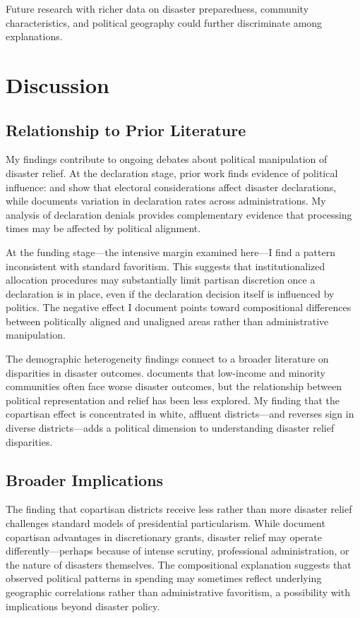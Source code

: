 \documentclass[12pt,letterpaper,oneside]{book}
\begin{document}
Future research with richer data on disaster preparedness, community characteristics, and political geography could further discriminate among explanations.

\section{Discussion}

\subsection{Relationship to Prior Literature}

My findings contribute to ongoing debates about political manipulation of disaster relief. At the declaration stage, prior work finds evidence of political influence: \cite{reeves2011political} and \cite{gasper2011make} show that electoral considerations affect disaster declarations, while \cite{sylves2008presidential} documents variation in declaration rates across administrations. My analysis of declaration denials provides complementary evidence that processing times may be affected by political alignment.

At the funding stage---the intensive margin examined here---I find a pattern inconsistent with standard favoritism. This suggests that institutionalized allocation procedures may substantially limit partisan discretion once a declaration is in place, even if the declaration decision itself is influenced by politics. The negative effect I document points toward compositional differences between politically aligned and unaligned areas rather than administrative manipulation.

The demographic heterogeneity findings connect to a broader literature on disparities in disaster outcomes. \cite{fothergill2004poverty} documents that low-income and minority communities often face worse disaster outcomes, but the relationship between political representation and relief has been less explored. My finding that the copartisan effect is concentrated in white, affluent districts---and reverses sign in diverse districts---adds a political dimension to understanding disaster relief disparities.

\subsection{Broader Implications}

The finding that copartisan districts receive less rather than more disaster relief challenges standard models of presidential particularism. While \cite{berry2010presidents} document copartisan advantages in discretionary grants, disaster relief may operate differently---perhaps because of intense scrutiny, professional administration, or the nature of disasters themselves. The compositional explanation suggests that observed political patterns in spending may sometimes reflect underlying geographic correlations rather than administrative favoritism, a possibility with implications beyond disaster policy.
\end{document}
